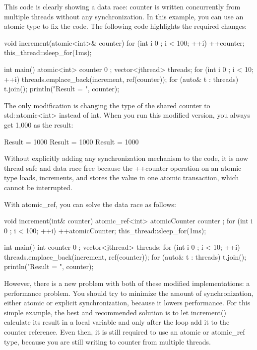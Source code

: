 This code is clearly showing a data race: counter is written concurrently from multiple threads without any synchronization. In this example, you can use an atomic type to fix the code. The following code highlights the required changes:

\begin{cpp}
void increment(atomic<int>& counter)
{
    for (int i { 0 }; i < 100; ++i) {
        ++counter;
        this_thread::sleep_for(1ms);
    }
}

int main()
{
    atomic<int> counter { 0 };
    vector<jthread> threads;
    for (int i { 0 }; i < 10; ++i) {
        threads.emplace_back(increment, ref(counter));
    }
    for (auto& t : threads) { t.join(); }
    println("Result = {}", counter);
}
\end{cpp}

The only modification is changing the type of the shared counter to std::atomic<int> instead of int. When you run this modified version, you always get 1,000 as the result:

\begin{shell}
Result = 1000
Result = 1000
Result = 1000
\end{shell}

Without explicitly adding any synchronization mechanism to the code, it is now thread safe and data race free because the ++counter operation on an atomic type loads, increments, and stores the value in one atomic transaction, which cannot be interrupted.

With atomic\_ref, you can solve the data race as follows:

\begin{cpp}
void increment(int& counter)
{
    atomic_ref<int> atomicCounter { counter };
    for (int i { 0 }; i < 100; ++i) {
        ++atomicCounter;
        this_thread::sleep_for(1ms);
    }
}

int main()
{
    int counter { 0 };
    vector<jthread> threads;
    for (int i { 0 }; i < 10; ++i) {
        threads.emplace_back(increment, ref(counter));
    }
    for (auto& t : threads) { t.join(); }
    println("Result = {}", counter);
}
\end{cpp}

However, there is a new problem with both of these modified implementations: a performance problem. You should try to minimize the amount of synchronization, either atomic or explicit synchronization, because it lowers performance. For this simple example, the best and recommended solution is to let increment() calculate its result in a local variable and only after the loop add it to the counter reference. Even then, it is still required to use an atomic or atomic\_ref type, because you are still writing to counter from multiple threads.

